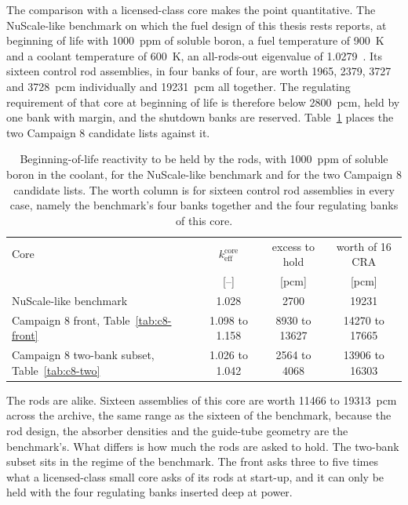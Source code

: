 The comparison with a licensed-class core makes the point
quantitative. The NuScale-like benchmark on which the fuel design of
this thesis rests reports, at beginning of life with \SI{1000}{ppm} of
soluble boron, a fuel temperature of \SI{900}{K} and a coolant
temperature of \SI{600}{K}, an all-rods-out eigenvalue of
\num{1.0279}~\cite{fridman_nuscale_benchmark_2023,ez_aldeen_2025}.
Its sixteen control rod assemblies, in four banks of four, are worth
\num{1965}, \num{2379}, \num{3727} and \SI{3728}{pcm} individually and
\SI{19231}{pcm} all together. The regulating requirement of that core
at beginning of life is therefore below \SI{2800}{pcm}, held by one
bank with margin, and the shutdown banks are reserved.
Table~\ref{tab:bench-compare} places the two Campaign 8 candidate
lists against it.

\begin{table}[htbp]
  \centering
  \small
  \caption[Reactivity to be held by the rods, against the
  benchmark]{Beginning-of-life reactivity to be held by the rods, with
  \SI{1000}{ppm} of soluble boron in the coolant, for the NuScale-like
  benchmark and for the two Campaign 8 candidate lists. The worth
  column is for sixteen control rod assemblies in every case, namely
  the benchmark's four banks together and the four regulating banks of
  this core.}
  \label{tab:bench-compare}
  \begin{tabularx}{\textwidth}{@{}>{\raggedright\arraybackslash}X ccc@{}}
    \toprule
    Core & $k_\mathrm{eff}^\mathrm{core}$ & excess to hold &
      worth of 16 CRA \\
     & [--] & [pcm] & [pcm] \\
    \midrule
    NuScale-like benchmark~\cite{fridman_nuscale_benchmark_2023}
      & 1.028 & 2700 & 19231 \\
    Campaign 8 front, Table~\ref{tab:c8-front}
      & 1.098 to 1.158 & 8930 to 13627 & 14270 to 17665 \\
    Campaign 8 two-bank subset, Table~\ref{tab:c8-two}
      & 1.026 to 1.042 & 2564 to 4068 & 13906 to 16303 \\
    \bottomrule
  \end{tabularx}
\end{table}

The rods are alike. Sixteen assemblies of this core are worth
\num{11466} to \SI{19313}{pcm} across the archive, the same range as
the sixteen of the benchmark, because the rod design, the absorber
densities and the guide-tube geometry are the benchmark's. What
differs is how much the rods are asked to hold. The two-bank subset
sits in the regime of the benchmark. The front asks three to five
times what a licensed-class small core asks of its rods at start-up,
and it can only be held with the four regulating banks inserted deep
at power.


